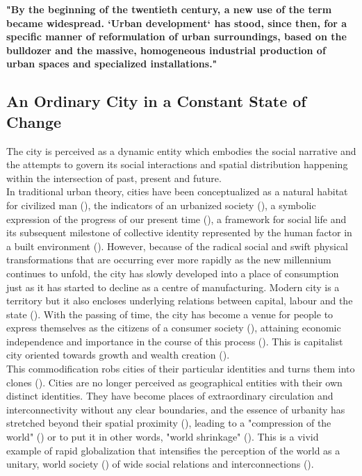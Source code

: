 \documentclass[11pt]{report}
\begin{document}
\textbf{"By the beginning of the twentieth century, a new use of the term became widespread. ‘Urban development‘ has stood, since then, for a specific manner of reformulation of urban surroundings, based on the bulldozer and the massive, homogeneous industrial production of urban spaces and specialized installations." \href{Esteva}{\cite{Esteva 2001}}}

\subsection{An Ordinary City in a Constant State of Change}

The city is perceived as a dynamic entity which embodies the social narrative and the attempts to govern its social interactions and spatial distribution happening within the intersection of past, present and future.
\\

In traditional urban theory, cities have been conceptualized as a natural habitat for civilized man (\href{Park}{\cite{Park1952}}), the indicators 
of an urbanized society (\href{Mumford}{\cite{Mumford1961}}), a symbolic expression of the progress of our present time (\href{Osborne}{\cite{Osborne1992}}), a 
framework for social life and its subsequent milestone of collective identity represented by the human factor in a built environment (\href{Berman}{\cite{Berman1988}}).
However, because of the radical social and swift physical transformations that are occurring ever more rapidly as the new millennium continues to unfold, the city has slowly developed into a place of consumption just as it has started to decline as a centre of manufacturing.
Modern city is a territory but it also encloses underlying relations between capital, labour and the state (\href{Castells}{\cite{Castells1983}}).
With the passing of time, the city has become a venue for people to express themselves as the citizens of a consumer society (\href{Slater}{\cite{Slater2003}}), attaining economic independence and importance in the course of this process (\href{Miles}{\cite{Miles2010}}).
This is capitalist city oriented towards growth and wealth creation (\href{Harvey}{\cite{Harvey1978}}).
\\   

This commodification robs cities of their particular identities and turns them into clones (\href{Miles}{\cite{Miles2010}}).
Cities are no longer perceived as geographical entities with their own distinct identities.
They have become places of extraordinary circulation and 
interconnectivity without any clear boundaries, and the essence of urbanity has stretched beyond their spatial proximity (\href{Amin}{\cite{Amin2006}}),  leading  to  a  "compression  of  the  world"  (\href{Robertson}{\cite{Robertson1992}}) or  to  put  it  in  other  words,  "world  shrinkage"
(\href{Larsson}{\cite{Larsson2001}}).
This is a vivid example of rapid globalization that intensifies the perception of the world as a unitary, world society (\href{Albrow}{\cite{AlbrowAndKing1990}}) of wide social relations and interconnections (\href{Giddens}{\cite{Giddens1992}}). 
\\
\end{document}
